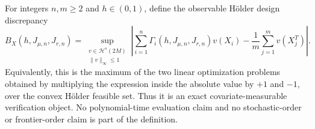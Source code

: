 For integers \(n,m\ge2\) and \(h\in(0,1)\), define the observable Hölder design discrepancy
\[
B_X(h,J_{\mu,n},J_{r,n})=
\sup_{\substack{v\in\mathcal H^s(2M)\\ \|v\|_\infty\le1}}
\left|\sum_{i=1}^n\Gamma_i(h,J_{\mu,n},J_{r,n})v(X_i)-\frac1m\sum_{j=1}^mv(X_j^T)\right|.
\]
Equivalently, this is the maximum of the two linear optimization problems obtained by multiplying the expression inside the absolute value by \(+1\) and \(-1\), over the convex Hölder feasible set. Thus it is an exact covariate-measurable verification object. No polynomial-time evaluation claim and no stochastic-order or frontier-order claim is part of the definition.